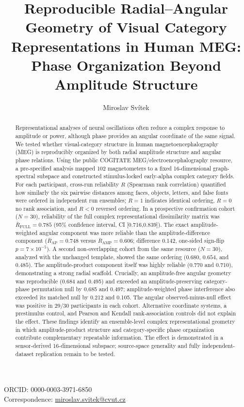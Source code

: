 \documentclass[11pt]{article}
\title{\textbf{Reproducible Radial--Angular Geometry of Visual Category Representations in Human MEG: Phase Organization Beyond Amplitude Structure}}
\author[1,2]{Miroslav Svítek}
\affil[1]{Czech Institute of Informatics, Robotics and Cybernetics, Czech Technical University in Prague, Prague, Czech Republic}
\affil[2]{Faculty of Natural Sciences, Matej Bel University, Banská Bystrica, Slovakia}
\date{}
\begin{document}
\maketitle
\begin{center}
ORCID: 0000-0003-3971-6850\\
Correspondence: \href{mailto:miroslav.svitek@cvut.cz}{miroslav.svitek@cvut.cz}
\end{center}

\begin{abstract}
Representational analyses of neural oscillations often reduce a complex response to amplitude or power, although phase provides an angular coordinate of the same signal. We tested whether visual-category structure in human magnetoencephalography (MEG) is reproducibly organized by both radial amplitude structure and angular phase relations. Using the public COGITATE MEG/electroencephalography resource, a pre-specified analysis mapped 102 magnetometers to a fixed 16-dimensional graph-spectral subspace and constructed stimulus-locked early-alpha complex category fields. For each participant, cross-run reliability $R$ (Spearman rank correlation) quantified how similarly the six pairwise distances among faces, objects, letters, and false fonts were ordered in independent run ensembles; $R=1$ indicates identical ordering, $R=0$ no rank association, and $R<0$ reversed ordering. In a prospective confirmation cohort ($N=30$), reliability of the full complex representational dissimilarity matrix was $\bar R_{\mathrm{FULL}}=0.785$ (95\% confidence interval, CI [0.716,0.839]). The exact amplitude-weighted angular component was more reliable than the amplitude-difference component ($\bar R_{\mathrm{AP}}=0.748$ versus $\bar R_{\mathrm{AMP}}=0.606$; difference 0.142, one-sided sign-flip $p=7\times10^{-5}$). A second non-overlapping cohort from the same resource ($N=30$), analyzed with the unchanged template, showed the same ordering ($0.680$, $0.654$, and $0.485$). The amplitude-product component itself was highly reliable (0.770 and 0.710), demonstrating a strong radial scaffold. Crucially, an amplitude-free angular geometry was reproducible (0.684 and 0.495) and exceeded an amplitude-preserving category-phase permutation null by 0.685 and 0.497; amplitude-weighted phase interference also exceeded its matched null by 0.212 and 0.105. The angular observed-minus-null effect was positive in 29/30 participants in each cohort. Alternative coordinate systems, a prestimulus control, and Pearson and Kendall rank-association controls did not explain the effect. These findings identify an ensemble-level complex representational geometry in which amplitude-product structure and category-specific phase organization contribute complementary repeatable information. The effect is demonstrated in a sensor-derived 16-dimensional subspace; source-space generality and fully independent-dataset replication remain to be tested.
\end{abstract}
\end{document}
